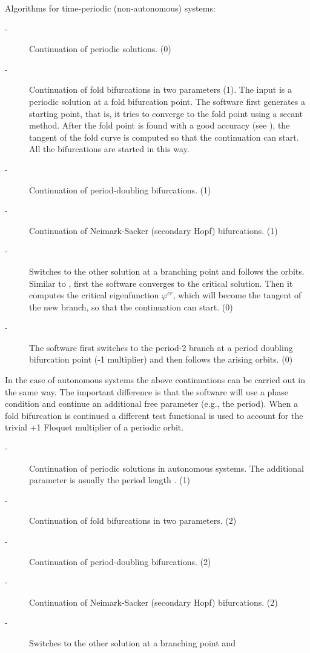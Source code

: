 \documentclass[10pt,a4paper]{ddedoc}
\begin{document}
\begin{description}
Algorithms for time-periodic (non-autonomous) systems:
\begin{description}
\item[ -] Continuation of periodic solutions. (0)
%
\item[ -] Continuation of fold bifurcations in two parameters (1). The
input is a periodic solution at a fold bifurcation point. The software first
generates a starting point, that is, it tries to converge to the fold point
using a secant method. After the fold point is found with a good accuracy (see
), the tangent of the fold curve is computed so that the continuation
can start. All the bifurcations are started in this way.
%
\item[ -] Continuation of period-doubling bifurcations. (1)
%
\item[ -] Continuation of Neimark-Sacker (secondary Hopf) bifurcations.
(1)
%
\item[ -] Switches to the other solution at a branching point and
follows the orbits. Similar to , first the software converges to
the critical solution. Then it computes the critical eigenfunction
$\varphi^{cr}$, which will become the tangent of the new branch, so that the
continuation can start. (0)
%
\item[ -] The software first switches to the period-2 branch at a
period doubling bifurcation point
(-1 multiplier) and then follows the arising orbits. (0)
\end{description}
In the case of autonomous systems the above continuations can be carried out in
the same way. The important difference is that the software will use a phase
condition and continue an additional free parameter (e.g., the period). When a
fold bifurcation is continued a different test functional is used to account for
the trivial +1 Floquet multiplier of a periodic orbit.
\begin{description}
\item[ -] Continuation of periodic solutions in autonomous systems. The
additional parameter is usually the period length . (1)
%
\item[ -] Continuation of fold bifurcations in two parameters. (2)
%
\item[ -] Continuation of period-doubling bifurcations. (2)
%
\item[ -] Continuation of Neimark-Sacker (secondary Hopf) bifurcations.
(2)
%
\item[ -] Switches to the other solution at a branching point and

\end{description}
\end{description}
\end{document}
